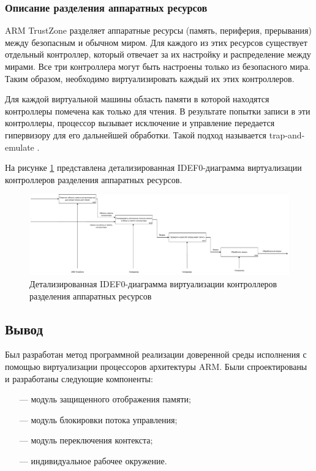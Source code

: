 \subsubsection{Описание разделения аппаратных ресурсов}

ARM TrustZone разделяет аппаратные ресурсы (память, периферия, прерывания) между безопасным и обычном миром. Для каждого из этих ресурсов существует отдельный контроллер, который отвечает за их настройку и распределение между мирами. Все три контроллера могут быть настроены только из безопасного мира. Таким образом, необходимо виртуализировать каждый их этих контроллеров.

Для каждой виртуальной машины область памяти в которой находятся контроллеры помечена как только для чтения. В результате попытки записи в эти контроллеры, процессор вызывает исключение и управление передается гипервизору для его дальнейшей обработки. Такой подход называется trap-and-emulate \cite{trap-and-emulate}. 

На рисунке \ref{fig:idef0-trap-and-emulate-2} представлена детализированная IDEF0-диаграмма виртуализации контроллеров разделения аппаратных ресурсов. 

\begin{figure}[h]
	\centering
	\includegraphics[width=\textwidth]{img/idef0-trap-and-emulate-2.pdf}
	\caption{Детализированная IDEF0-диаграмма виртуализации контроллеров разделения аппаратных ресурсов}
	\label{fig:idef0-trap-and-emulate-2}
\end{figure}

\subsection*{Вывод}

Был разработан метод программной реализации доверенной среды исполнения с помощью виртуализации процессоров архитектуры ARM. Были спроектированы и разработаны следующие компоненты:

\begin{itemize}
	\item [---] модуль защищенного отображения памяти;
	\item [---] модуль блокировки потока управления;
	\item [---] модуль переключения контекста;
	\item [---] индивидуальное рабочее окружение.
\end{itemize}
 
